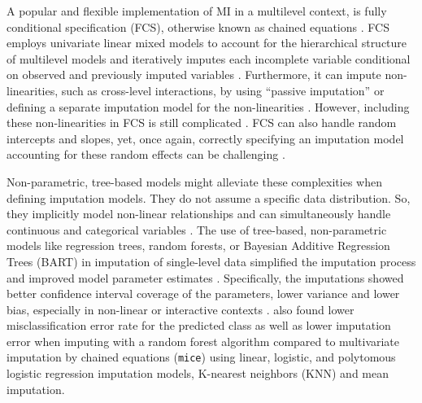 \documentclass[3p,12pt,a4paper]{elsarticle}
\begin{document}
A popular and flexible implementation of MI in a multilevel context, is fully conditional specification (FCS), otherwise known as chained equations \citep{audigier2018, burgette2010, vanbuuren2007, grund2018a}. FCS employs univariate linear mixed models to account for the hierarchical structure of multilevel models \citep{mistlerComparisonJointModel2017, enders2018, resche-rigon2018} and iteratively imputes each incomplete variable conditional on observed and previously imputed variables \citep{mistlerComparisonJointModel2017, buurenFlexibleImputationMissing2018, enders2016, enders2018, enders2018a, hughes2014, grund2018a}. Furthermore, it can impute non-linearities, such as cross-level interactions, by using ``passive imputation'' or defining a separate imputation model for the non-linearities \citep{buurenFlexibleImputationMissing2018, grund2018}. However, including these non-linearities in FCS is still complicated \citep{grund2021, grund2018,buurenFlexibleImputationMissing2018}. FCS can also handle random intercepts and slopes, yet, once again, correctly specifying an imputation model accounting for these random effects can be challenging \citep{grund2021, grund2018,buurenFlexibleImputationMissing2018}.


Non-parametric, tree-based models might alleviate these complexities when defining imputation models. They do not assume a specific data distribution. So, they implicitly model non-linear relationships and can simultaneously handle continuous and categorical variables \citep{hill2020, burgette2010, lin2019, chipman2010, james2021, salditt2023, breiman1984}. The use of tree-based, non-parametric models like regression trees, random forests, or Bayesian Additive Regression Trees (BART) in imputation of single-level data simplified the imputation process and improved model parameter estimates \citep{burgette2010,xu2016,silva2022,waljee2013}. Specifically, the imputations showed better confidence interval coverage of the parameters, lower variance and lower bias, especially in non-linear or interactive contexts \citep{burgette2010, xu2016, silva2022}. \citet{waljee2013} also found lower misclassification error rate for the predicted class as well as lower imputation error when imputing with a random forest algorithm compared to multivariate imputation by chained equations (\texttt{mice}) using linear, logistic, and polytomous logistic regression imputation models, K-nearest neighbors (KNN) and mean imputation.
\end{document}
